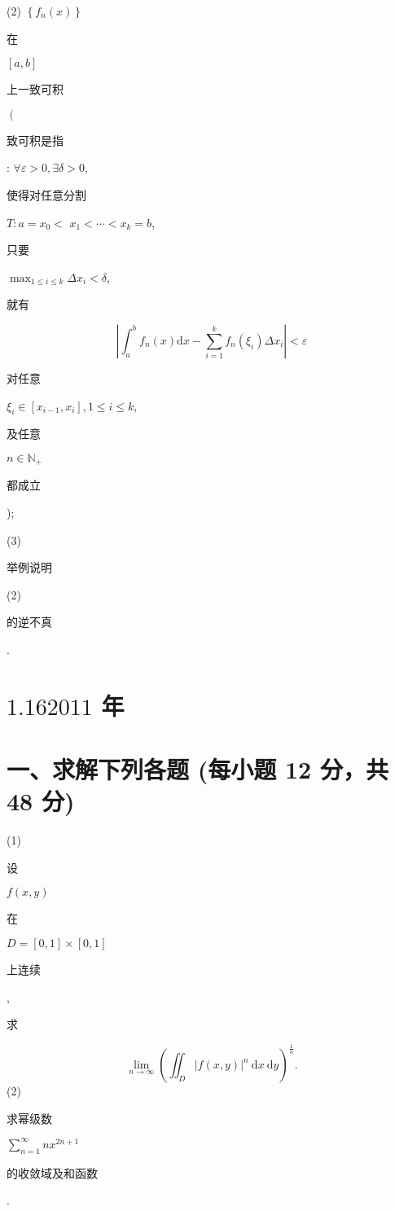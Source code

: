 \documentclass[10pt]{article}
\begin{document}
(2) $\left\{f_{n}(x)\right\}$ \begin{CJK}{UTF8}{mj}在\end{CJK} $[a, b]$ \begin{CJK}{UTF8}{mj}上一致可积\end{CJK} $\left(\right.$ \begin{CJK}{UTF8}{mj}致可积是指\end{CJK}: $\forall \varepsilon>0, \exists \delta>0$, \begin{CJK}{UTF8}{mj}使得对任意分割\end{CJK} $T: a=x_{0}<$ $x_{1}<\cdots<x_{k}=b$, \begin{CJK}{UTF8}{mj}只要\end{CJK} $\max _{1 \leqslant i \leqslant k} \Delta x_{i}<\delta$, \begin{CJK}{UTF8}{mj}就有\end{CJK}
$$
\left|\int_{a}^{b} f_{n}(x) \mathrm{d} x-\sum_{i=1}^{k} f_{n}\left(\xi_{i}\right) \Delta x_{i}\right|<\varepsilon
$$
\begin{CJK}{UTF8}{mj}对任意\end{CJK} $\xi_{i} \in\left[x_{i-1}, x_{i}\right], 1 \leqslant i \leqslant k$, \begin{CJK}{UTF8}{mj}及任意\end{CJK} $n \in \mathbb{N}_{+}$\begin{CJK}{UTF8}{mj}都成立\end{CJK});

(3) \begin{CJK}{UTF8}{mj}举例说明\end{CJK} (2) \begin{CJK}{UTF8}{mj}的逆不真\end{CJK}.

\section{$1.162011$ 年}
\section{一、求解下列各题 (每小题 12 分，共 48 分)}
(1) \begin{CJK}{UTF8}{mj}设\end{CJK} $f(x, y)$ \begin{CJK}{UTF8}{mj}在\end{CJK} $D=[0,1] \times[0,1]$ \begin{CJK}{UTF8}{mj}上连续\end{CJK}, \begin{CJK}{UTF8}{mj}求\end{CJK}
$$
\lim _{n \rightarrow \infty}\left(\iint_{D}|f(x, y)|^{n} \mathrm{~d} x \mathrm{~d} y\right)^{\frac{1}{n}} .
$$
(2) \begin{CJK}{UTF8}{mj}求幂级数\end{CJK} $\sum_{n=1}^{\infty} n x^{2 n+1}$ \begin{CJK}{UTF8}{mj}的收敛域及和函数\end{CJK}.
\end{document}
